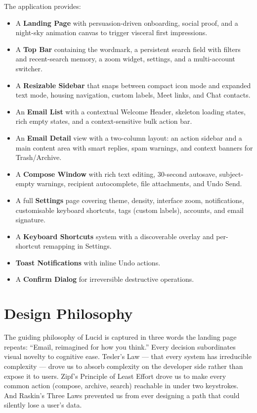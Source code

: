 \documentclass[12pt,a4paper]{report}
\begin{document}
The application provides:

\begin{itemize}[leftmargin=*, itemsep=2pt]
  \item A \textbf{Landing Page} with persuasion-driven onboarding, social proof, and a night-sky
        animation canvas to trigger visceral first impressions.
  \item A \textbf{Top Bar} containing the wordmark, a persistent search field with filters and
        recent-search memory, a zoom widget, settings, and a multi-account switcher.
  \item A \textbf{Resizable Sidebar} that snaps between compact icon mode and expanded text mode,
        housing navigation, custom labels, Meet links, and Chat contacts.
  \item An \textbf{Email List} with a contextual Welcome Header, skeleton loading states, rich
        empty states, and a context-sensitive bulk action bar.
  \item An \textbf{Email Detail} view with a two-column layout: an action sidebar and a main
        content area with smart replies, spam warnings, and context banners for Trash/Archive.
  \item A \textbf{Compose Window} with rich text editing, 30-second autosave, subject-empty
        warnings, recipient autocomplete, file attachments, and Undo Send.
  \item A full \textbf{Settings} page covering theme, density, interface zoom, notifications,
        customisable keyboard shortcuts, tags (custom labels), accounts, and email signature.
  \item A \textbf{Keyboard Shortcuts} system with a discoverable overlay and per-shortcut
        remapping in Settings.
  \item \textbf{Toast Notifications} with inline Undo actions.
  \item A \textbf{Confirm Dialog} for irreversible destructive operations.
\end{itemize}

\section{Design Philosophy}

The guiding philosophy of Lucid is captured in three words the landing page repeats: ``Email,
reimagined for how you think.'' Every decision subordinates visual novelty to cognitive ease.
Tesler's Law — that every system has irreducible complexity — drove us to absorb complexity on
the developer side rather than expose it to users. Zipf's Principle of Least Effort drove us
to make every common action (compose, archive, search) reachable in under two keystrokes.
And Raskin's Three Laws prevented us from ever designing a path that could silently lose a
user's data.
\end{document}
